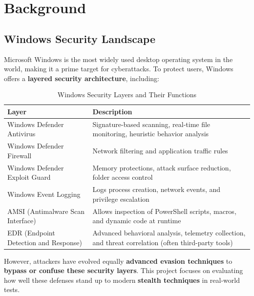 \setcounter{secnumdepth}{-1}

\chapter{Background}
\section{Windows Security Landscape} 
Microsoft Windows is the most widely used desktop operating system in the world, making it a prime target for cyberattacks. 
To protect users, Windows offers a \textbf{layered security architecture}, including:

\begin{table}[H]
    \centering
    \begin{tabular}{|p{5cm}|p{10cm}|}
        \hline
        \textbf{Layer} & \textbf{Description} \\
        \hline
        Windows Defender Antivirus & Signature-based scanning, real-time file monitoring, heuristic behavior analysis \\
        \hline
        Windows Defender Firewall & Network filtering and application traffic rules \\
        \hline
        Windows Defender Exploit Guard & Memory protections, attack surface reduction, folder access control \\
        \hline
        Windows Event Logging & Logs process creation, network events, and privilege escalation \\
        \hline
        AMSI (Antimalware Scan Interface) & Allows inspection of PowerShell scripts, macros, and dynamic code at runtime \\
        \hline
        EDR (Endpoint Detection and Response) & Advanced behavioral analysis, telemetry collection, and threat correlation (often third-party tools) \\
        \hline
    \end{tabular}
    \caption{Windows Security Layers and Their Functions}
    \label{tab:windows_security_layers}
\end{table}

However, attackers have evolved equally \textbf{advanced evasion techniques} to \textbf{bypass or confuse these security layers}. This project focuses on evaluating how well these defenses stand up to modern \textbf{stealth techniques} in real-world tests.

